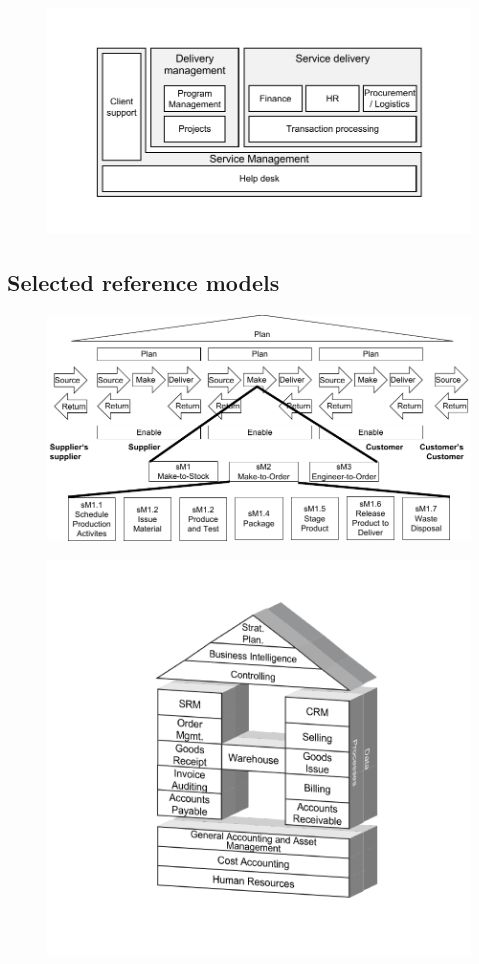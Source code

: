 		\begin{figure}[caption={Outsourcing provider processes}, label={fig:scheweproc}]
	{	\includegraphics[width=.8\textwidth]{figures/scheweproc.pdf}\\
		 } 
\end{figure}
\subsection{Selected reference models}

\label{app:refmods}
	\begin{figure}[caption={SCOR Model}, label={fig:scor}]
	{	\includegraphics[width=.8\textwidth]{figures/scor.pdf}\\
	\parbox{.8\textwidth}{}} 
\end{figure}

	\begin{figure}[caption={Retail-H}, label={fig:retailh}]
	{	\includegraphics[width=.6\textwidth]{figures/retailh.pdf}
	\\ \parbox{0.6\textwidth}{}}

	
\end{figure}

